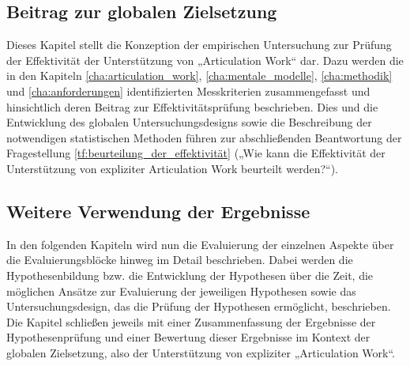 \subsection{Beitrag zur globalen Zielsetzung}

Dieses Kapitel stellt die Konzeption der empirischen Untersuchung zur Prüfung der Effektivität der Unterstützung von „Articulation Work“ dar. Dazu werden die in den Kapiteln \ref{cha:articulation_work}, \ref{cha:mentale_modelle}, \ref{cha:methodik} und \ref{cha:anforderungen} identifizierten Messkriterien zusammengefasst und hinsichtlich deren Beitrag zur Effektivitätsprüfung beschrieben. Dies und die Entwicklung des globalen Untersuchungsdesigns sowie die Beschreibung der notwendigen statistischen Methoden führen zur abschließenden Beantwortung der Fragestellung \ref{tf:beurteilung_der_effektivität} („Wie kann die Effektivität der Unterstützung von expliziter Articulation Work beurteilt werden?“).

\subsection{Weitere Verwendung der Ergebnisse}

In den folgenden Kapiteln wird nun die Evaluierung der einzelnen Aspekte über die Evaluierungsblöcke hinweg im Detail beschrieben. Dabei werden die Hypothesenbildung bzw. die Entwicklung der Hypothesen über die Zeit, die möglichen Ansätze zur Evaluierung der jeweiligen Hypothesen sowie das Untersuchungsdesign, das die Prüfung der Hypothesen ermöglicht, beschrieben. Die Kapitel schließen jeweils mit einer Zusammenfassung der Ergebnisse der Hypothesenprüfung und einer Bewertung dieser Ergebnisse im Kontext der globalen Zielsetzung, also der Unterstützung von expliziter „Articulation Work“.


